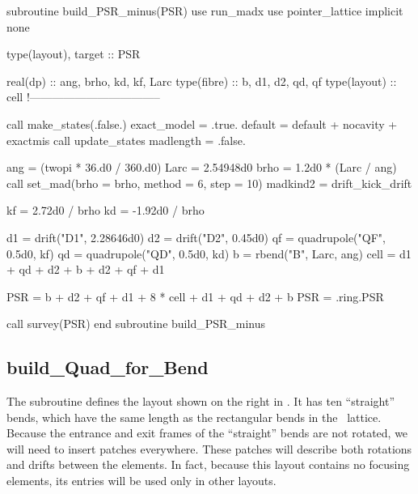 \begin{ptccode}
subroutine  build_PSR_minus(PSR)
use run_madx
use pointer_lattice
implicit none

type(layout), target :: PSR

real(dp) :: ang, brho, kd, kf, Larc
type(fibre) :: b, d1, d2, qd, qf
type(layout) :: cell
!-----------------------------------

call make_states(.false.)
exact_model = .true.
default = default + nocavity + exactmis
call update_states
madlength = .false.

ang = (twopi * 36.d0 / 360.d0)
Larc = 2.54948d0
brho = 1.2d0 * (Larc / ang)
call set_mad(brho = brho, method = 6, step = 10)
madkind2 = drift_kick_drift

kf =  2.72d0 / brho
kd = -1.92d0 / brho

d1 = drift("D1", 2.28646d0)
d2 = drift("D2", 0.45d0)
qf = quadrupole("QF", 0.5d0, kf)
qd = quadrupole("QD", 0.5d0, kd)
b  = rbend("B", Larc, ang)
cell = d1 + qd + d2 + b + d2 + qf + d1

PSR = b + d2 + qf + d1 + 8 * cell + d1 + qd + d2 + b
PSR = .ring.PSR

call survey(PSR)
end subroutine build_PSR_minus
\end{ptccode}


\subsection{build\_Quad\_for\_Bend}

%
The subroutine  defines the layout shown
on the right in . It has ten ``straight'' bends,
which have the same length as the rectangular bends in the
\PSR\ lattice. Because the entrance and exit frames of the ``straight''
bends are not rotated, we will need to insert patches everywhere.
These patches will describe both rotations and drifts between the
elements. In fact, because this layout contains no focusing elements,
its entries will be used only in other layouts.


